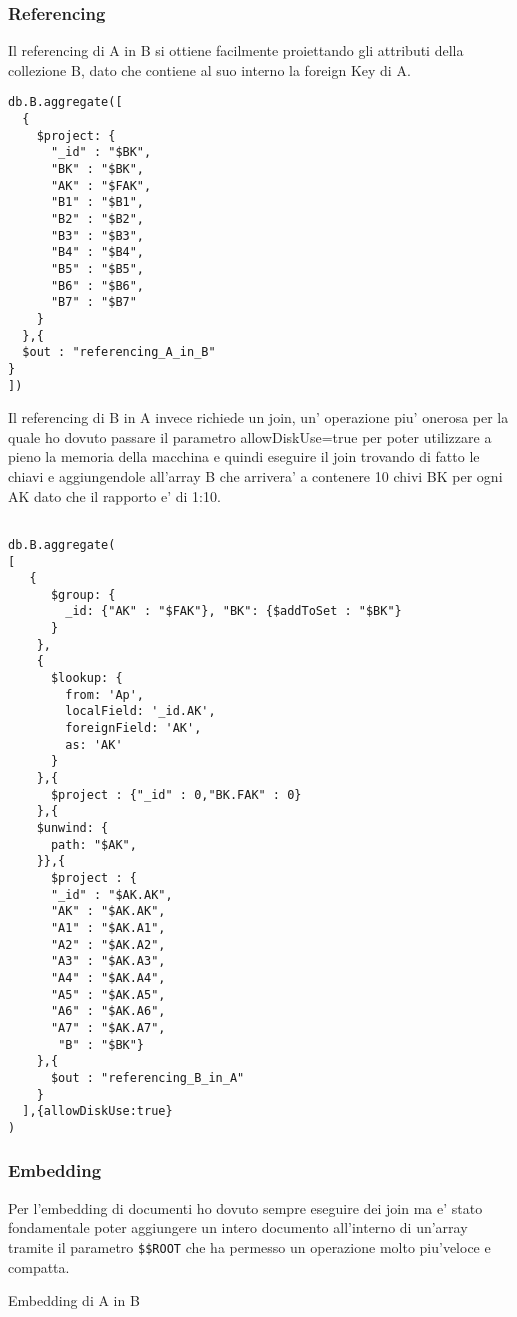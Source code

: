 \subsubsection{Referencing}

Il referencing di A in B si ottiene facilmente proiettando gli attributi della collezione B, dato che contiene al suo interno la foreign Key di A.

\begin{verbatim}
db.B.aggregate([
  {
    $project: {
      "_id" : "$BK",
      "BK" : "$BK",
      "AK" : "$FAK",
      "B1" : "$B1",   
      "B2" : "$B2",
      "B3" : "$B3",
      "B4" : "$B4",
      "B5" : "$B5",
      "B6" : "$B6",
      "B7" : "$B7"
    }
  },{
  $out : "referencing_A_in_B"
}
])
\end{verbatim}

Il referencing di B in A invece richiede un join, un' operazione piu' onerosa per la quale ho dovuto passare il parametro allowDiskUse=true per poter utilizzare
a pieno la memoria della macchina e quindi eseguire il join trovando di fatto le chiavi e aggiungendole all'array B che arrivera' a contenere 10 chivi BK per ogni 
AK dato che il rapporto e' di 1:10. 

\begin{verbatim}
    
db.B.aggregate(
[
   {
      $group: {
        _id: {"AK" : "$FAK"}, "BK": {$addToSet : "$BK"}
      }
    },
    {
      $lookup: {
        from: 'Ap',
        localField: '_id.AK',
        foreignField: 'AK',
        as: 'AK'
      }
    },{
      $project : {"_id" : 0,"BK.FAK" : 0}
    },{
    $unwind: {
      path: "$AK",
    }},{
      $project : {
      "_id" : "$AK.AK",
      "AK" : "$AK.AK",
      "A1" : "$AK.A1", 
      "A2" : "$AK.A2", 
      "A3" : "$AK.A3", 
      "A4" : "$AK.A4",
      "A5" : "$AK.A5",
      "A6" : "$AK.A6",
      "A7" : "$AK.A7",
       "B" : "$BK"} 
    },{
      $out : "referencing_B_in_A"
    }
  ],{allowDiskUse:true}
)
\end{verbatim}

\subsubsection{Embedding}
Per l'embedding di documenti ho dovuto sempre eseguire dei join ma e' stato fondamentale poter aggiungere un intero documento all'interno di un'array tramite il parametro
\verb|$$ROOT| che ha permesso un operazione molto piu'veloce e compatta.

Embedding di A in B 

